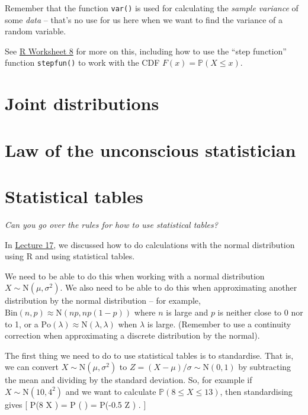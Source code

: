 \documentclass[
  letterpaper,
]{report}
\theoremstyle{definition}
\theoremstyle{definition}
\theoremstyle{remark}
\begin{document}
Remember that the function \texttt{var()} is used for calculating the
\emph{sample variance} of some \emph{data} -- that's no use for us here
when we want to find the variance of a random variable.

See \protect\hyperlink{R}{R Worksheet 8} for more on this, including how
to use the ``step function'' function \texttt{stepfun()} to work with
the CDF \(F(x) = \mathbb P(X \leq x)\).

\hypertarget{joint-distributions}{%
\section{Joint distributions}\label{joint-distributions}}

\hypertarget{law-of-the-unconscious-statistician}{%
\section{Law of the unconscious
statistician}\label{law-of-the-unconscious-statistician}}

\hypertarget{statistical-tables}{%
\section{Statistical tables}\label{statistical-tables}}

\emph{Can you go over the rules for how to use statistical tables?}

In \protect\hyperlink{L17-normal}{Lecture 17}, we discussed how to do
calculations with the normal distribution using R and using statistical
tables.

We need to be able to do this when working with a normal distribution
\(X \sim \mathrm{N}(\mu, \sigma^2)\). We also need to be able to do this
when approximating another distribution by the normal distribution --
for example, \(\mathrm{Bin}(n,p) \approx \mathrm{N}(np, np(1-p))\) where
\(n\) is large and \(p\) is neither close to 0 nor to 1, or a
\(\mathrm{Po}(\lambda) \approx \mathrm{N}(\lambda,\lambda)\) when
\(\lambda\) is large. (Remember to use a continuity correction when
approximating a discrete distribution by the normal).

The first thing we need to do to use statistical tables is to
standardise. That is, we can convert
\(X \sim \mathrm{N}(\mu, \sigma^2)\) to
\(Z = (X - \mu)/\sigma \sim \mathrm{N}(0,1)\) by subtracting the mean
and dividing by the standard deviation. So, for example if
\(X \sim \mathrm{N}(10, 4^2)\) and we want to calculate
\(\mathbb P(8 \leq X \leq 13)\), then standardising gives {[}
\mathbb P(8 \leq X ) = \mathbb P \left( 
\leq {} \leq {} \right) = \mathbb P(-0.5
\leq Z ) . {]}
\end{document}
